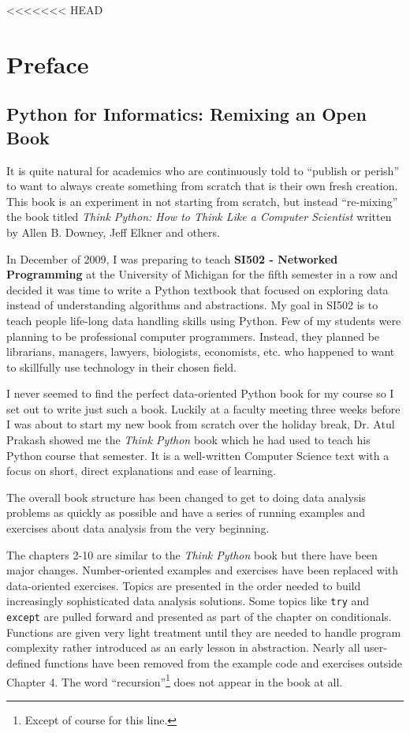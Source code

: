 
<<<<<<< HEAD
\chapter{Preface}

\section*{Python for Informatics: Remixing an Open Book}

It is quite natural for academics who are continuously told to 
``publish or perish'' to want to always create something from scratch
that is their own fresh creation.   This book is an 
experiment in not starting from scratch, but instead ``re-mixing''
the book titled
\emph{Think Python: How to Think Like
a Computer Scientist}
written by Allen B. Downey, Jeff Elkner and others.

In December of 2009, I was preparing to teach
{\bf SI502 - Networked Programming} at the University of Michigan
for the fifth semester in a row and decided it was time
to write a Python textbook that focused on exploring data
instead of understanding algorithms and abstractions.
My goal in SI502 is to teach people life-long data handling 
skills using Python.  Few of my
students were planning to be professional 
computer programmers.  Instead, they
planned be librarians, managers, lawyers, biologists, economists, etc. 
who happened to want to skillfully use technology in their chosen field.

I never seemed to find the perfect data-oriented Python
book for my course so I set out 
to write just such a book.  Luckily at a faculty meeting three weeks
before I was about to start my new book from scratch over 
the holiday break, 
Dr. Atul Prakash showed me the \emph{Think Python} book which he had
used to teach his Python course that semester.  
It is a well-written Computer Science text with a focus on 
short, direct explanations and ease of learning.  

The overall book structure
has been changed to get to doing data analysis problems as quickly as
possible and have a series of running examples and exercises 
about data analysis from the very beginning.  

The chapters 2-10 are similar to the \emph{Think Python} book
but there have been major changes. Number-oriented examples and
exercises have been replaced with data-oriented exercises.
Topics are presented in the order needed to build increasingly
sophisticated data analysis solutions. Some topics like {\tt try} and
{\tt except} are pulled forward and presented as part of the chapter
on conditionals.  Functions are given very light treatment until 
they are needed to handle program complexity rather introduced 
as an early lesson in abstraction.  Nearly all user-defined functions
have been removed from the example code and exercises outside Chapter 4.
The word ``recursion''\footnote{Except of course for this line.}
does not appear in the book at all.

